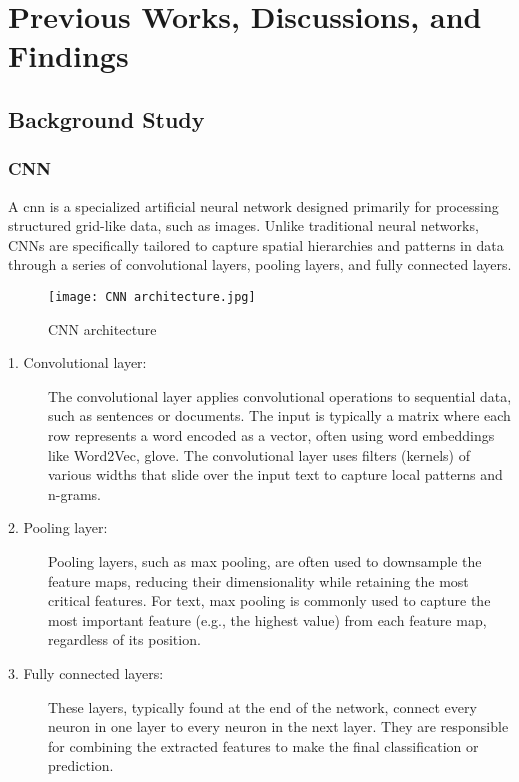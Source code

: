 \chapter{Previous Works, Discussions, and Findings}

\section{Background Study}

\subsection{CNN}

A \ac{cnn} is a specialized artificial neural network designed primarily for processing structured grid-like data, such as images. Unlike traditional neural networks, CNNs are specifically tailored to capture spatial hierarchies and patterns in data through a series of convolutional layers, pooling layers, and fully connected layers.

\begin{figure}[h]
    \centering
    \texttt{[image: CNN architecture.jpg]}
    \caption{CNN architecture}
    \label{fig:cnn artchitecture}
\end{figure}

\begin{description}

    \item[1. Convolutional layer:] The convolutional layer applies convolutional operations to sequential data, such as sentences or documents. The input is typically a matrix where each row represents a word encoded as a vector, often using word embeddings like Word2Vec, \ac{glove}. The convolutional layer uses filters (kernels) of various widths that slide over the input text to capture local patterns and n-grams.

    \item[2. Pooling layer:] Pooling layers, such as max pooling, are often used to downsample the feature maps, reducing their dimensionality while retaining the most critical features. For text, max pooling is commonly used to capture the most important feature (e.g., the highest value) from each feature map, regardless of its position.
   
    \item[3. Fully connected layers:] These layers, typically found at the end of the network, connect every neuron in one layer to every neuron in the next layer. They are responsible for combining the extracted features to make the final classification or prediction.
       
\end{description}

